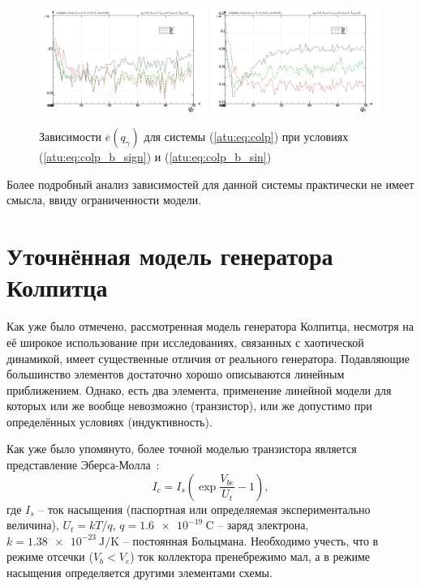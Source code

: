 \begin{figure}[htb!]
\centerline{
  \includegraphics[width=0.49\textwidth]{p/mod/colp_m5p-p_qg_e_sign.png}
  \includegraphics[width=0.49\textwidth]{p/mod/colp_m5p-p_qg_e_sin.png}
}
  \caption{Зависимости  $\overline{e}(q_\gamma)$ для системы (\ref{atu:eq:colp})
  при условиях (\ref{atu:eq:colp_b_sign}) и (\ref{atu:eq:colp_b_sin})
}
\label{atu:f:colp_e_qgamma}
\end{figure}

Более подробный анализ зависимостей для данной системы практически не имеет смысла,
ввиду ограниченности модели.







\section{Уточнённая модель генератора Колпитца}  %

Как уже было отмечено,
рассмотренная  модель
генератора Колпитца, несмотря на её широкое использование
при исследованиях, связанных с хаотической динамикой,
имеет существенные отличия от реального генератора.
Подавляющие большинство элементов достаточно хорошо описываются линейным
приближением. Однако, есть два элемента,
применение линейной модели для которых или же вообще невозможно (транзистор),
или же допустимо при определённых условиях (индуктивность).

Как уже было упомянуто, более точной моделью транзистора является представление
Эберса-Молла~\cite{horowitz}:
%
\begin{equation}
  I_c = I_s \left( \exp\frac{V_{be}}{U_t} - 1 \right),
  \label{atu:eq:ebers-moll}
\end{equation}
%
где
$I_s$ -- ток насыщения (паспортная или определяемая экспериментально величина),
$U_t=kT/q$,
$q = \SI{1.6e-19}{\coulomb}$ -- заряд электрона,
$k = \SI{1.38e-23}{\joule/\kelvin}$ -- постоянная Больцмана.
Необходимо учесть, что в режиме отсечки ($V_b < V_e$) ток коллектора пренебрежимо мал,
а в режиме насыщения определяется другими элементами схемы.

